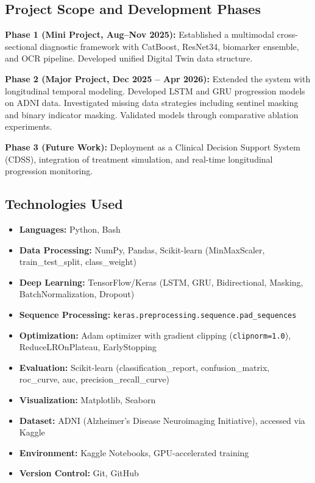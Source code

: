 \documentclass[12pt,singleside,a4paper]{article}
\begin{document}
\subsection{Project Scope and Development Phases}

\textbf{Phase 1 (Mini Project, Aug--Nov 2025):} Established a multimodal cross-sectional diagnostic framework with CatBoost, ResNet34, biomarker ensemble, and OCR pipeline. Developed unified Digital Twin data structure.

\textbf{Phase 2 (Major Project, Dec 2025 -- Apr 2026):} Extended the system with longitudinal temporal modeling. Developed LSTM and GRU progression models on ADNI data. Investigated missing data strategies including sentinel masking and binary indicator masking. Validated models through comparative ablation experiments.

\textbf{Phase 3 (Future Work):} Deployment as a Clinical Decision Support System (CDSS), integration of treatment simulation, and real-time longitudinal progression monitoring.

\subsection{Technologies Used}

\begin{itemize}
    \item \textbf{Languages:} Python, Bash
    \item \textbf{Data Processing:} NumPy, Pandas, Scikit-learn (MinMaxScaler, train\_test\_split, class\_weight)
    \item \textbf{Deep Learning:} TensorFlow/Keras (LSTM, GRU, Bidirectional, Masking, BatchNormalization, Dropout)
    \item \textbf{Sequence Processing:} \texttt{keras.preprocessing.sequence.pad\_sequences}
    \item \textbf{Optimization:} Adam optimizer with gradient clipping (\texttt{clipnorm=1.0}), ReduceLROnPlateau, EarlyStopping
    \item \textbf{Evaluation:} Scikit-learn (classification\_report, confusion\_matrix, roc\_curve, auc, precision\_recall\_curve)
    \item \textbf{Visualization:} Matplotlib, Seaborn
    \item \textbf{Dataset:} ADNI (Alzheimer's Disease Neuroimaging Initiative), accessed via Kaggle
    \item \textbf{Environment:} Kaggle Notebooks, GPU-accelerated training
    \item \textbf{Version Control:} Git, GitHub
\end{itemize}
\end{document}
